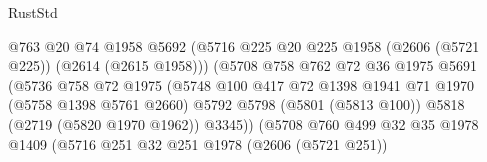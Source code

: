 \begin{lexlean}{RustStd}
\begin{coremodule}
                                        @763
                                        @20
                                        @74
                                        @1958
                                        @5692
                                        (@5716
                                          @225
                                          @20
                                          @225
                                          @1958
                                          (@2606 (@5721 @225))
                                          (@2614 (@2615 @1958)))
                                        (@5708
                                          @758
                                          @762
                                          @72
                                          @36
                                          @1975
                                          @5691
                                          (@5736
                                            @758
                                            @72
                                            @1975
                                            (@5748
                                              @100
                                              @417
                                              @72
                                              @1398
                                              @1941
                                              @71
                                              @1970
                                              (@5758 @1398 @5761 @2660)
                                              @5792
                                              @5798
                                              (@5801 (@5813 @100))
                                              @5818
                                              (@2719 (@5820 @1970 @1962))
                                              @3345))
                                          (@5708
                                            @760
                                            @499
                                            @32
                                            @35
                                            @1978
                                            @1409
                                            (@5716
                                              @251
                                              @32
                                              @251
                                              @1978
                                              (@2606 (@5721 @251))

\end{coremodule}
\end{lexlean}
